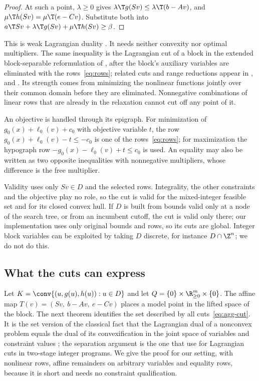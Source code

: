 \begin{proof}
At such a point, $\lambda\ge0$ gives $\lambda\T g(Sv)\le\lambda\T(b-Av)$,
and $\mu\T h(Sv)=\mu\T(e-Cv)$. Substitute both into
$a\T Sv+\lambda\T g(Sv)+\mu\T h(Sv)\ge\beta$.
\end{proof}

This is weak Lagrangian duality \citep[Section~5.1]{BoydVandenberghe2004}.
It needs neither convexity nor optimal multipliers. The same inequality is
the Lagrangian cut of a block in the extended block-separable
reformulation of \citet[Section~7.1]{Nowak2005}, after the block's
auxiliary variables are eliminated with the rows~\eqref{eq:rows};
related cuts and range reductions appear in
\citet{TawarmalaniSahinidis2004}, \citet{KaruppiahGrossmann2008} and
\citet{DomesNeumaier2016}. Its strength comes from minimizing the
nonlinear functions jointly over their common domain before they are
eliminated. Nonnegative combinations of linear rows that are already in
the relaxation cannot cut off any point of it.

An objective is handled through its epigraph. For minimization of
$g_0(x)+\ell_0(v)+c_0$ with objective variable $t$, the row
$g_0(x)+\ell_0(v)-t\le-c_0$ is one of the rows~\eqref{eq:rows}; for
maximization the hypograph row $-g_0(x)-\ell_0(v)+t\le c_0$ is used. An
equality may also be written as two opposite inequalities with
nonnegative multipliers, whose difference is the free multiplier.

Validity uses only $Sv\in D$ and the selected rows. Integrality, the
other constraints and the objective play no role, so the cut is valid for
the mixed-integer feasible set and for its closed convex hull. If $D$ is
built from bounds valid only at a node of the search tree, or from an
incumbent cutoff, the cut is valid only there; our implementation uses
only original bounds and rows, so its cuts are global. Integer block
variables can be exploited by taking $D$ discrete, for instance
$D\cap\Z^n$; we do not do this.

\subsection{What the cuts can express}\label{sec:closure}

Let $K=\conv\{(u,g(u),h(u)):u\in D\}$ and let $Q=\{0\}\times\R^m_{\ge0}\times\{0\}$.
The affine map $T(v)=(Sv,\ b-Av,\ e-Cv)$ places a model point in the
lifted space of the block. The next theorem identifies the set described
by all cuts~\eqref{eq:agg-cut}. It is the set version of the classical
fact that the Lagrangian dual of a nonconvex problem equals the dual of
its convexification in the joint space of variables and constraint
values \citep{Falk1969,Geoffrion1974,FeltenmarkKiwiel2000,LemarechalRenaud2001};
the separation argument is the one that \citet[Theorem~3]{ChenLuedtke2022}
use for Lagrangian cuts in two-stage integer programs. We give the proof
for our setting, with nonlinear rows, affine remainders on arbitrary
variables and equality rows, because it is short and needs no constraint
qualification.

